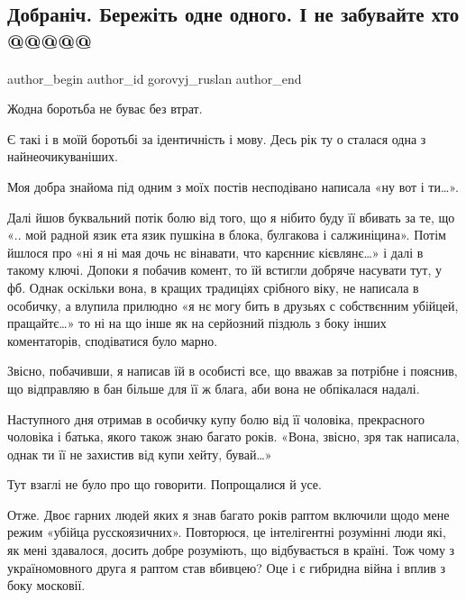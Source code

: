  
 
 
 
 
 
\subsection{Добраніч. Бережіть одне одного. І не забувайте хто @@@@@}
\label{sec:20_09_2021.fb.gorovyj_ruslan.1.dobranich_mova_hujlo}
 
\ifcmt
 author_begin
   author_id gorovyj_ruslan
 author_end
\fi

Жодна боротьба не буває без втрат.

Є такі і в моїй боротьбі за ідентичність і мову. Десь рік ту о сталася одна з
найнеочикуваніших. 

Моя добра знайома під одним з моїх постів несподівано написала «ну вот і ти…».

Далі йшов буквальний потік болю від того, що я нібито буду її вбивать за те, що
«.. мой радной язик ета язик пушкіна в блока, булгакова і салжиніцина». Потім
йшлося про «ні я ні мая дочь нє вінавати, что карєнниє кієвлянє…» і далі в
такому ключі. Допоки я побачив комент, то їй встигли добряче насувати тут, у
фб. Однак оскільки вона, в кращих традиціях срібного віку, не написала в
особичку, а влупила прилюдно «я нє могу бить в друзьях с собствєнним убійцей,
пращайтє…» то ні на що інше як на серйозний піздюль з боку інших коментаторів,
сподіватися було марно.

Звісно, побачивши, я написав їй в особисті все, що вважав за потрібне і
пояснив, що відправляю в бан більше для її ж блага, аби вона не обпікалася
надалі.

Наступного дня отримав в особичку купу болю від її чоловіка, прекрасного
чоловіка і батька, якого також знаю багато років. «Вона, звісно, зря так
написала, однак ти її не захистив від купи хейту, бувай…»

Тут взаглі не було про що говорити. Попрощалися й усе.

Отже. Двоє гарних людей яких я знав багато років раптом включили щодо мене
режим «убійца русскоязичних». Повторюся, це інтелігентні розумінні люди які, як
мені здавалося, досить добре розуміють, що відбувається в країні. Тож чому з
україномовного друга я раптом став вбивцею? Оце і є гибридна війна і вплив з
боку московії. 

